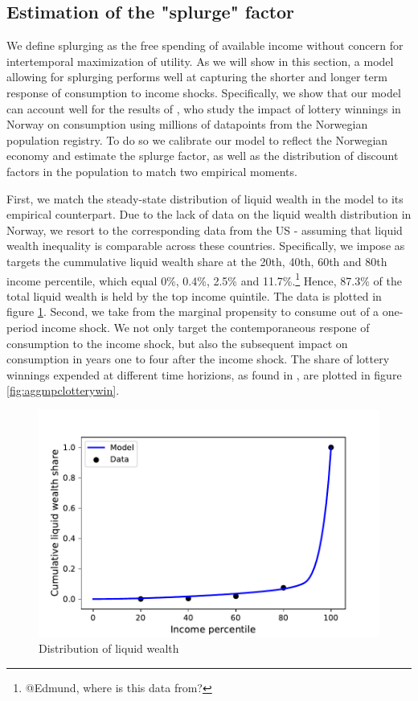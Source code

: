 \documentclass[../HAFiscal]{subfiles}
\begin{document}
\subsection{Estimation of the "splurge" factor}	

We define splurging as the free spending of available income without concern for intertemporal maximization of utility. As we will show in this section, a model allowing for splurging performs well at capturing the shorter and longer term response of consumption to income shocks. Specifically, we show that our model can account well for the results of \citet{fagereng_mpc_2021}, who study the impact of lottery winnings in Norway on consumption using millions of datapoints from the Norwegian population registry. To do so we calibrate our model to reflect the Norwegian economy and estimate the splurge factor, as well as the distribution of discount factors in the population to match two empirical moments. 	
	
First, we match the steady-state distribution of liquid wealth in the model to its empirical counterpart. Due to the lack of data on the liquid wealth distribution in Norway, we resort to the corresponding data from the US - assuming that liquid wealth inequality is comparable across these countries. Specifically, we impose as targets the cummulative liquid wealth share at the 20th, 40th, 60th and 80th income percentile, which equal 0\%, 0.4\%, 2.5\% and 11.7\%.\footnote{@Edmund, where is this data from?} Hence, 87.3\% of the total liquid wealth is  held by the top income quintile. The data is plotted in figure \ref{fig:liquwealthdistribution}.
Second, we take from \citet{fagereng_mpc_2021} the marginal propensity to consume out of a one-period income shock. We not only target the contemporaneous respone of consumption to the income shock, but also the subsequent impact on consumption in years one to four after the income shock. The share of lottery winnings expended at different time horizions, as found in \citet{fagereng_mpc_2021}, are plotted in figure \ref{fig:aggmpclotterywin}.


\begin{figure}[htb]
	\centering
	\includegraphics[width=0.8\linewidth]{../Code/HA-Models/Target_AggMPCX_LiquWealth/Figures/LiquWealth_Distribution}
	\caption{Distribution of liquid wealth}
	\label{fig:liquwealthdistribution}
\end{figure}
\end{document}
